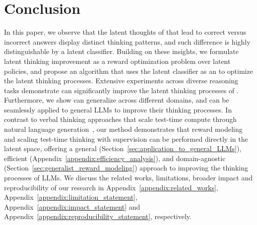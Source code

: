 \documentclass{article} %
\begin{document}
\section{Conclusion}
\vspace{-0.2cm}
In this paper, %
%
we observe that the latent thoughts of \LRLM that lead to correct versus incorrect answers display distinct thinking patterns, and such difference is highly distinguishable by a latent classifier.
%
Building on these insights, we formulate latent thinking improvement as a reward optimization problem over latent policies, and propose an \LTO algorithm that uses the latent classifier as an \LRM to optimize the latent thinking processes. Extensive experiments across diverse reasoning tasks demonstrate \LTO can significantly improve the latent thinking processes of \LRLM.
%
Furthermore, we show \LRM can generalize across different domains, and \LTO can be seamlessly applied to general LLMs to improve their thinking processes.
%
In contrast to verbal thinking approaches that scale test-time compute through natural language generation~\citep{guo2025deepseek,muennighoff2025s1}, our method demonstrates that reward modeling and scaling test-time thinking with supervision can be performed directly in the latent space, offering a general (Section~\ref{sec:application_to_general_LLMs}), efficient (Appendix~\ref{appendix:efficiency_analysis}), and domain-agnostic (Section~\ref{sec:generalist_reward_modeling}) approach to improving the thinking processes of LLMs. We discuss the related works, limitations, broader impact and reproducibility of our research in Appendix~\ref{appendix:related_works}, Appendix~\ref{appendix:limitation_statement}, Appendix~\ref{appendix:impact_statement} and Appendix~\ref{appendix:reproducibility_statement}, respectively.
\newpage


\newpage
\appendix
\setcounter{table}{0}
\setcounter{figure}{0}
\setcounter{theorem}{0}
\setcounter{definition}{0}
\renewcommand{\thetable}{A\arabic{table}}
\renewcommand{\thefigure}{A\arabic{figure}}
\end{document}
